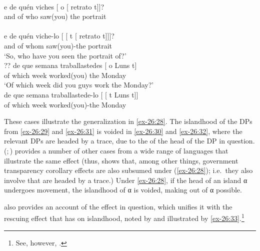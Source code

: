 \documentclass[output=paper]{langsci/langscibook}
\begin{document}
\ea\label{ex-26:29}  \parencite[81]{Uriagereka1988}\\
    \gll * e de quén viches [ o [ retrato t]]?\\
        {} and of who saw(you) {} the {} portrait\\
\ex\label{ex-26:30}  \parencite[81]{Uriagereka1988}\\
    \gll e de quén viche-lo [ [ t [ retrato t]]]?\\
	        and of whom saw(you)-the {} {} {} {} portrait\\
    \glt \enquote*{So, who have you seen the portrait of?}
\ex\label{ex-26:31}  \parencite[58]{Boskovic2016}\\
    \gll ?? de que semana traballastedes [ o Luns t]\\
		  {}  of which week worked(you) {} the Monday\\
    \glt \hphantom{??}\enquote*{Of which week did you guys work the Monday?}
\ex\label{ex-26:32}  \parencite[58]{Boskovic2016}\\
	\gll    de  que  semana  traballastede-lo [ [ t  Luns t]] \\
            of  which week worked(you)-the {} {} {} Monday\\
\z

These cases illustrate the generalization in \eqref{ex-26:28}. The islandhood
of the DPs from \eqref{ex-26:29} and \eqref{ex-26:31} is voided in \eqref{ex-26:30} and \eqref{ex-26:32}, where the relevant
DPs are headed by a trace, due to the  of the head of the DP in
question.  \citeauthor{Boskovic2013b} (\citeyear{Boskovic2013b};\,\citeyear{Boskovic2015})
provides a number of other cases from a wide range of languages that illustrate
the same effect (thus, \citealt{Boskovic2013b} shows that, among other things,
 government transparency corollary
effects are also subsumed under (\ref{ex-26:28}); i.e.\ they also involve 
that are headed by a trace.) Under \eqref{ex-26:28}, if the head of an island α undergoes
movement, the islandhood of α is voided, making  out of α
possible.

\textcite{Boskovic2011,Boskovic2013b} also provides an account of the effect in
question, which unifies it with the rescuing effect that  has on
islandhood, noted by \citet{Ross1969} and illustrated by \eqref{ex-26:33}.\footnote{See,
    however, \textcite{Abels2011,BarEllTho2014}.}
\end{document}
